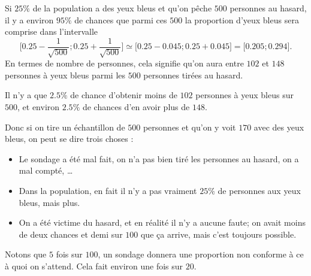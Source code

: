 \begin{example}
    Si \( 25\%\) de la population a des yeux bleus et qu'on pêche \( 500\) personnes au hasard, il y a environ \( 95\%\) de chances que parmi ces \( 500\) la proportion d'yeux bleus sera comprise dans l'intervalle
    \begin{equation}
        \mathopen[ 0.25-\frac{1}{ \sqrt{500} } ; 0.25+\frac{1}{ \sqrt{500} } \mathclose]\simeq\mathopen[ 0.25-0.045 ; 0.25+0.045 \mathclose]=\mathopen[ 0.205 ; 0.294 \mathclose].
    \end{equation}
    En termes de nombre de personnes, cela signifie qu'on aura entre \( 102\) et \( 148\) personnes à yeux bleus parmi les \( 500\) personnes tirées au hasard.

    Il n'y a que \( 2.5\%\) de chance d'obtenir moins de \( 102\) personnes à yeux bleus sur \( 500\), et environ \( 2.5\%\) de chances d'en avoir plus de \( 148\).

    Donc si on tire un échantillon de \( 500\) personnes et qu'on y voit $170$ avec des yeux bleus, on peut se dire trois choses :
    \begin{itemize}
        \item Le sondage a été mal fait, on n'a pas bien tiré les personnes au hasard, on a mal compté, \ldots
        \item Dans la population, en fait il n'y a pas vraiment \( 25\%\) de personnes aux yeux bleus, mais plus.
        \item On a été victime du hasard, et en réalité il n'y a aucune faute; on avait moins de deux chances et demi sur \( 100\) que ça arrive, mais c'est toujours possible.
    \end{itemize}
    Notons que \( 5\) fois sur \( 100\), un sondage donnera une proportion non conforme à ce à quoi on s'attend. Cela fait environ une fois sur \( 20\).
\end{example}
